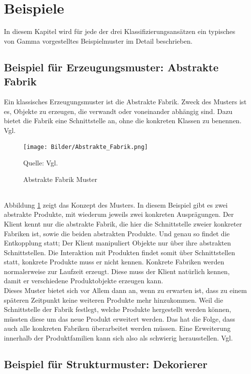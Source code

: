 \documentclass[fontsize=11pt,a4paper,final]{scrreprt}[2003/01/01]
\newcommand*{\quelle}{%
	\footnotesize Quelle: 
}
\begin{document}
\section{Beispiele}
In diesem Kapitel wird für jede der drei Klassifizierungsansätzen ein typisches von \mbox{Gamma} vorgestelltes Beispielmuster im Detail beschrieben.

\subsection{Beispiel für Erzeugungsmuster: Abstrakte Fabrik}

Ein klassisches Erzeugungsmuster ist die Abstrakte Fabrik. Zweck des Musters ist es, Objekte zu erzeugen, die verwandt oder voneinander abhängig sind. Dazu bietet die Fabrik eine Schnittstelle an, ohne die konkreten Klassen zu benennen. Vgl. \cite[S. 107]{gamma2004}

\begin{figure}[H]
	\centering
	\texttt{[image: Bilder/Abstrakte\_Fabrik.png]}
	\caption{Abstrakte Fabrik Muster}
	\quelle{ Vgl. \cite[S. 109]{gamma2004}}
	\label{fig:Abstrakte_Fabrik}
\end{figure}
\ \\
Abbildung \ref{fig:Abstrakte_Fabrik} zeigt das Konzept des Musters. In diesem Beispiel gibt es zwei abstrakte Produkte, mit wiederum jeweils zwei konkreten Ausprägungen. Der Klient kennt nur die abstrakte Fabrik, die hier die Schnittstelle zweier konkreter Fabriken ist, sowie die beiden abstrakten Produkte. Und genau so findet die Entkopplung statt; Der Klient manipuliert Objekte nur über ihre abstrakten Schnittstellen. Die Interaktion mit Produkten findet somit über Schnittstellen statt, konkrete Produkte muss er nicht kennen. Konkrete Fabriken werden normalerweise zur Laufzeit erzeugt. Diese muss der Klient natürlich kennen, damit er verschiedene Produktobjekte erzeugen kann. \\
Dieses Muster bietet sich vor Allem dann an, wenn zu erwarten ist, dass zu einem späteren Zeitpunkt keine weiteren Produkte mehr hinzukommen. Weil die Schnittstelle der Fabrik festlegt, welche Produkte hergestellt werden können, müssten diese um das neue Produkt erweitert werden. Das hat die Folge, dass auch alle konkreten Fabriken überarbeitet werden müssen. Eine Erweiterung innerhalb der Produktfamilien kann sich also als schwierig herausstellen. Vgl. \cite[S. 109-111]{gamma2004}

\subsection{Beispiel für Strukturmuster: Dekorierer}
\end{document}
